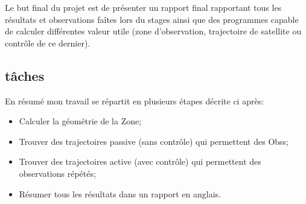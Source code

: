 \documentclass[12pt]{article} %
\begin{document}
		
		Le but final du projet est de présenter un rapport final rapportant tous les résultats et observations faîtes lors du stages ainsi que des programmes capable de calculer différentes valeur utile (zone d'observation, trajectoire de satellite ou contrôle de ce dernier).
		\newpage
		\subsection{tâches}
		En résumé mon travail se répartit en plusieurs étapes décrite ci après:
		\begin{itemize}
			\item Calculer la géométrie de la \gls{Zone};
			\item Trouver des trajectoires passive (sans contrôle) qui permettent des \glspl{Obs};
			\item Trouver des trajectoires active (avec contrôle) qui permettent des observations répétés;
			\item Résumer tous les résultats dans un rapport en anglais.
		\end{itemize}
		
\end{document}
